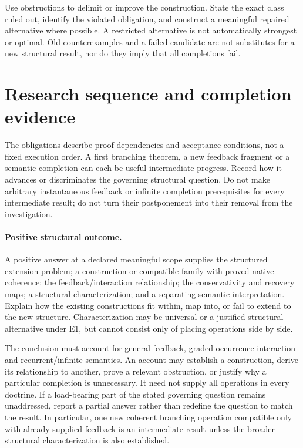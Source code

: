 \documentclass[11pt]{article}
\begin{document}
Use obstructions to delimit or improve the construction. State the exact class ruled out, identify the violated obligation, and construct a meaningful repaired alternative where possible. A restricted alternative is not automatically strongest or optimal. Old counterexamples and a failed candidate are not substitutes for a new structural result, nor do they imply that all completions fail.

\section{Research sequence and completion evidence}
The obligations describe proof dependencies and acceptance conditions, not a fixed execution order. A first branching theorem, a new feedback fragment or a semantic completion can each be useful intermediate progress. Record how it advances or discriminates the governing structural question. Do not make arbitrary instantaneous feedback or infinite completion prerequisites for every intermediate result; do not turn their postponement into their removal from the investigation.

\paragraph{Positive structural outcome.}
A positive answer at a declared meaningful scope supplies the structured extension problem; a construction or compatible family with proved native coherence; the feedback/interaction relationship; the conservativity and recovery maps; a structural characterization; and a separating semantic interpretation. Explain how the existing constructions fit within, map into, or fail to extend to the new structure. Characterization may be universal or a justified structural alternative under E1, but cannot consist only of placing operations side by side.

The conclusion must account for general feedback, graded occurrence interaction and recurrent/infinite semantics. An account may establish a construction, derive its relationship to another, prove a relevant obstruction, or justify why a particular completion is unnecessary. It need not supply all operations in every doctrine. If a load-bearing part of the stated governing question remains unaddressed, report a partial answer rather than redefine the question to match the result. In particular, one new coherent branching operation compatible only with already supplied feedback is an intermediate result unless the broader structural characterization is also established.
\end{document}
